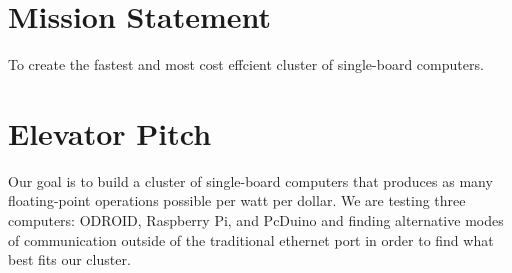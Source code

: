 
\section{Mission Statement}
To create the fastest and most cost effcient cluster of single-board computers.

\section{Elevator Pitch}
Our goal is to build a cluster of single-board computers that produces as many floating-point operations possible per watt per dollar. We are testing three computers:  ODROID, Raspberry Pi, and PcDuino and finding alternative modes of communication outside of the traditional ethernet port in order to find what best fits our cluster.
